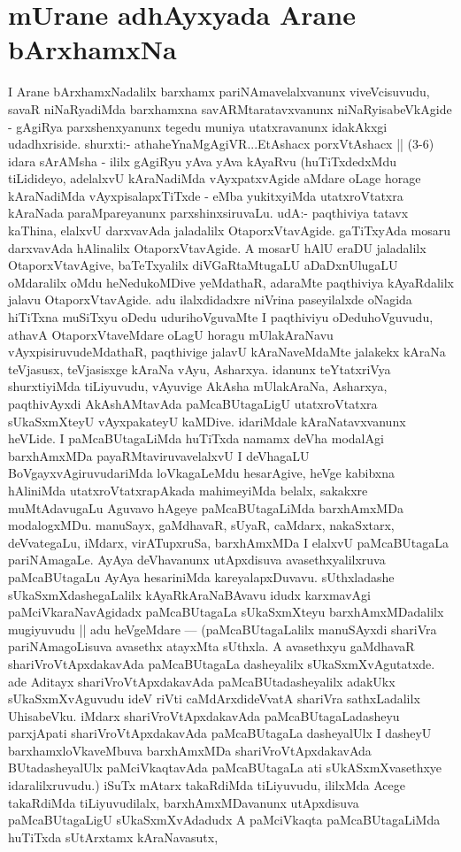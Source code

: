
\section*{mUrane adhAyxyada Arane bArxhamxNa}


\begin{artha}
I Arane bArxhamxNadalilx barxhamx pariNAmavelalxvanunx viveVcisuvudu, savaR niNaRyadiMda barxhamxna savARMtaratavxvanunx niNaRyisabeVkAgide - gAgiRya parxshenxyanunx tegedu muniya utatxravanunx idakAkxgi udadhxriside. shurxti:- athaheYnaMgAgiVR...EtAshacx porxVtAshacx || (3-6) idara sArAMsha - ililx gAgiRyu yAva yAva kAyaRvu (huTiTxdedxMdu tiLidideyo, adelalxvU kAraNadiMda vAyxpatxvAgide aMdare oLage horage kAraNadiMda vAyxpisalapxTiTxde - eMba yukitxyiMda utatxroVtatxra kAraNada paraMpareyanunx parxshinxsiruvaLu. udA:- paqthiviya tatavx kaThina, elalxvU darxvavAda jaladalilx OtaporxVtavAgide. gaTiTxyAda mosaru darxvavAda hAlinalilx OtaporxVtavAgide. A mosarU hAlU eraDU jaladalilx OtaporxVtavAgive, baTeTxyalilx diVGaRtaMtugaLU aDaDxnUlugaLU oMdaralilx oMdu heNedukoMDive yeMdathaR, adaraMte paqthiviya kAyaRdalilx jalavu OtaporxVtavAgide. adu ilalxdidadxre niVrina paseyilalxde oNagida hiTiTxna muSiTxyu oDedu udurihoVguvaMte I paqthiviyu oDeduhoVguvudu, athavA OtaporxVtaveMdare oLagU horagu mUlakAraNavu vAyxpisiruvudeMdathaR, paqthivige jalavU kAraNaveMdaMte jalakekx kAraNa teVjasusx, teVjasisxge kAraNa vAyu, Asharxya. idanunx teYtatxriVya shurxtiyiMda tiLiyuvudu, vAyuvige AkAsha mUlakAraNa, Asharxya, paqthivAyxdi AkAshAMtavAda paMcaBUtagaLigU utatxroVtatxra sUkaSxmXteyU vAyxpakateyU kaMDive. idariMdale kAraNatavxvanunx heVLide. I paMcaBUtagaLiMda huTiTxda namamx deVha modalAgi barxhAmxMDa payaRMtaviruvavelalxvU I deVhagaLU BoVgayxvAgiruvudariMda loVkagaLeMdu hesarAgive, heVge kabibxna hAliniMda utatxroVtatxrapAkada mahimeyiMda belalx, sakakxre muMtAdavugaLu Aguvavo hAgeye paMcaBUtagaLiMda barxhAmxMDa modalogxMDu. manuSayx, gaMdhavaR, sUyaR, caMdarx, nakaSxtarx, deVvategaLu, iMdarx, virATupxruSa, barxhAmxMDa I elalxvU paMcaBUtagaLa pariNAmagaLe. AyAya deVhavanunx utApxdisuva avasethxyalilxruva paMcaBUtagaLu AyAya hesariniMda kareyalapxDuvavu. sUthxladashe sUkaSxmXdashegaLalilx kAyaRkAraNaBAvavu idudx karxmavAgi paMciVkaraNavAgidadx paMcaBUtagaLa sUkaSxmXteyu barxhAmxMDadalilx mugiyuvudu || adu  heVgeMdare --- (paMcaBUtagaLalilx manuSAyxdi shariVra pariNAmagoLisuva avasethx atayxMta sUthxla. A avasethxyu gaMdhavaR shariVroVtApxdakavAda paMcaBUtagaLa dasheyalilx sUkaSxmXvAgutatxde. ade Aditayx shariVroVtApxdakavAda paMcaBUtadasheyalilx adakUkx sUkaSxmXvAguvudu ideV riVti caMdArxdideVvatA shariVra sathxLadalilx UhisabeVku. iMdarx shariVroVtApxdakavAda paMcaBUtagaLadasheyu parxjApati shariVroVtApxdakavAda paMcaBUtagaLa dasheyalUlx I dasheyU barxhamxloVkaveMbuva barxhAmxMDa shariVroVtApxdakavAda BUtadasheyalUlx paMciVkaqtavAda paMcaBUtagaLa ati sUkASxmXvasethxye idaralilxruvudu.) iSuTx mAtarx takaRdiMda tiLiyuvudu, ililxMda Acege takaRdiMda tiLiyuvudilalx, barxhAmxMDavanunx utApxdisuva paMcaBUtagaLigU sUkaSxmXvAdadudx A paMciVkaqta paMcaBUtagaLiMda huTiTxda sUtArxtamx kAraNavasutx, 
\end{artha}
